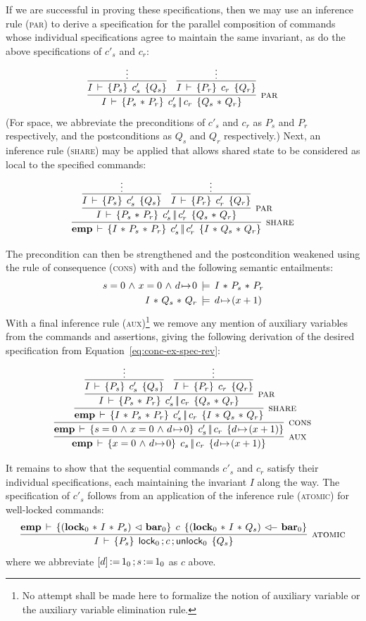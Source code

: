 \documentclass[11pt]{report}
\begin{document}
If we are successful in proving these specifications, then we may use an inference rule (\textsc{par}) to derive a specification for the parallel composition of commands whose individual specifications agree to maintain the same invariant, as do the above specifications of $c'_s$ and $c_r$: \[ \infer[\textsc{par}]{\spec{I}{P_s \fsep P_r}{c'_s \oppar c_r}{Q_s \fsep Q_r}}{ \infer{\spec{I}{P_s}{c'_s}{Q_s}}{\vdots} & \infer{\spec{I}{P_r}{c_r}{Q_r}}{\vdots} }\] (For space, we abbreviate the preconditions of $c'_s$ and $c_r$ as $P_s$ and $P_r$ respectively, and the postconditions as $Q_s$ and $Q_r$ respectively.) Next, an inference rule (\textsc{share}) may be applied that allows shared state to be considered as local to the specified commands: \[ \infer[\textsc{share}]{ \spec{\femp}{I \fsep P_s \fsep P_r}{c'_s \oppar c'_r}{I \fsep Q_s \fsep Q_r} }{\infer[\textsc{par}]{\spec{I}{P_s \fsep P_r}{c'_s \oppar c'_r}{Q_s \fsep Q_r}}{ \infer{\spec{I}{P_s}{c'_s}{Q_s}}{\vdots} & \infer{\spec{I}{P_r}{c'_r}{Q_r}}{\vdots} }}\]

The precondition can then be strengthened and the postcondition weakened using the rule of consequence (\textsc{cons}) with and the following semantic entailments: \begin{align*}
s = 0 \operatorname{\,\wedge\,} x = 0 \operatorname{\,\wedge\,} d \!\mapsto\! 0 & \,\models\, I \operatorname{\,\ast\,} P_s \operatorname{\,\ast\,} P_r \\ 
I \operatorname{\,\ast\,} Q_s \operatorname{\,\ast\,} Q_r & \,\models\, d \!\mapsto\! (x + 1)
\end{align*} With a final inference rule (\textsc{aux})\footnote{No attempt shall be made here to formalize the notion of auxiliary variable or the auxiliary variable elimination rule.} we remove any mention of auxiliary variables from the commands and assertions, giving the following derivation of the desired specification from Equation~\ref{eq:conc-ex-spec-rev}: 
\[ \infer[\textsc{aux}]{ \spec{\femp}{x = 0 \conj d \fpointsto 0}{c_s \oppar c_r}{d \fpointsto (x+1)} }{\infer[\textsc{cons}]{ \spec{\femp}{s = 0 \conj x = 0 \conj d \fpointsto 0}{c'_s \oppar c_r}{d \fpointsto (x+1)} }{\infer[\textsc{share}]{ \spec{\femp}{I \fsep P_s \fsep P_r}{c'_s \oppar c_r}{I \fsep Q_s \fsep Q_r} }{\infer[\textsc{par}]{\spec{I}{P_s \fsep P_r}{c'_s \oppar c_r}{Q_s \fsep Q_r}}{ \infer{\spec{I}{P_s}{c'_s}{Q_s}}{\vdots} & \infer{\spec{I}{P_r}{c_r}{Q_r}}{\vdots} }}}}\]

It remains to show that the sequential commands $c'_s$ and $c_r$ satisfy their individual specifications, each maintaining the invariant $I$ along the way. The specification of $c'_s$ follows from an application of the inference rule (\textsc{atomic}) for well-locked commands: \[ \infer[\textsc{atomic}]{\spec{I}{P_s}{\clock_0 \opseq c \opseq \cunlock_0}{Q_s} }{\spec{\femp}{(\flock{0} \fsep I \fsep P_s) \fseq \fbar{0}}{c}{(\flock{0} \fsep I \fsep Q_s) \fseqri \fbar{0}}}\] where we abbreviate $\left[ d \right] \operatorname{:\!=} 1_0 \operatorname{;} s \operatorname{:\!=} 1_0$ as $c$ above. 
\end{document}

